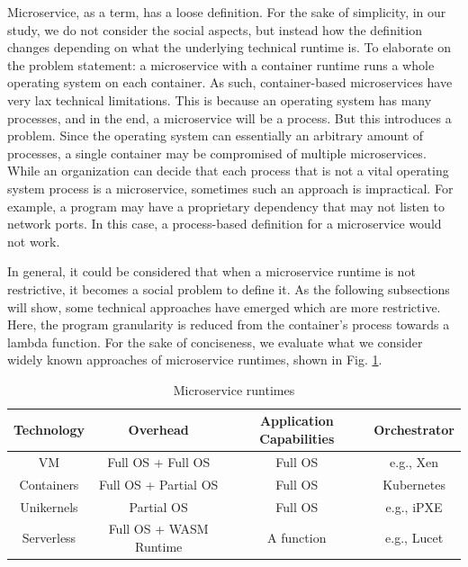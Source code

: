 \documentclass{IEEEtran}
\begin{document}
Microservice, as a term, has a loose definition. For the sake of simplicity, in our study, we do not consider the social aspects, but instead how the definition changes depending on what the underlying technical runtime is. To elaborate on the problem statement: a microservice with a container runtime runs a whole operating system on each container. As such, container-based microservices have very lax technical limitations. This is because an operating system has many processes, and in the end, a microservice will be a process. But this introduces a problem. Since the operating system can essentially an arbitrary amount of processes, a single container may be compromised of multiple microservices. While an organization can decide that each process that is not a vital operating system process is a microservice, sometimes such an approach is impractical. For example, a program may have a proprietary dependency that may not listen to network ports. In this case, a process-based definition for a microservice would not work.

In general, it could be considered that when a microservice runtime is not restrictive, it becomes a social problem to define it. As the following subsections will show, some technical approaches have emerged which are more restrictive. Here, the program granularity is reduced from the container's process towards a lambda function. For the sake of conciseness, we evaluate what we consider widely known approaches of microservice runtimes, shown in Fig. \ref{tb:runtimes}.

\begin{table}
\begin{center}
\caption{Microservice runtimes}
\begin{tabular}{ c|c|c|c }
 Technology & Overhead & Application Capabilities & Orchestrator \\
 \hline
 VM & Full OS + Full OS & Full OS & e.g., Xen \\
 Containers & Full OS + Partial OS & Full OS & Kubernetes \cite{burns2016borg} \\
 Unikernels & Partial OS  & Full OS & e.g., iPXE  \\
 Serverless & Full OS + WASM Runtime  & A function & e.g., Lucet \\
\end{tabular}
\end{center}
\label{tb:runtimes}
\end{table}
\end{document}
